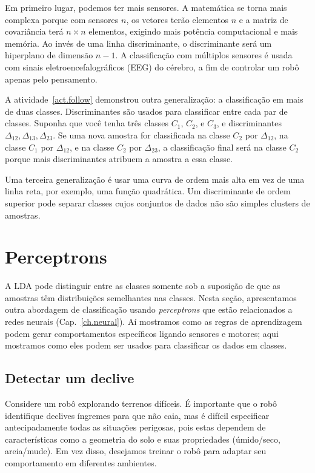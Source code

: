 Em primeiro lugar, podemos ter mais sensores. A matemática se torna mais complexa porque com sensores $n$, os vetores terão elementos $n$ e a matriz de covariância terá $n\times n$ elementos, exigindo mais potência computacional e mais memória. Ao invés de uma linha discriminante, o discriminante será um hiperplano de dimensão $n-1$. A classificação com múltiplos sensores é usada com sinais eletroencefalográficos (EEG) do cérebro, a fim de controlar um robô apenas pelo pensamento.

A atividade~\ref{act.follow} demonstrou outra generalização: a classificação em mais de duas classes. Discriminantes são usados para classificar entre cada par de classes. Suponha que você tenha três classes $C_1$, $C_2$, e $C_3$, e discriminantes $\Delta_{12}, \Delta_{13}, \Delta_{23}$. Se uma nova amostra for classificada na classe $C_2$ por $\Delta_{12}$, na classe $C_1$ por $\Delta_{12}$, e na classe $C_2$ por $\Delta_{23}$, a classificação final será na classe $C_2$ porque mais discriminantes atribuem a amostra a essa classe.

Uma terceira generalização é usar uma curva de ordem mais alta em vez de uma linha reta, por exemplo, uma função quadrática. Um discriminante de ordem superior pode separar classes cujos conjuntos de dados não são simples clusters de amostras.

\section{Perceptrons}\label{s.perceptrons}

A LDA pode distinguir entre as classes somente sob a suposição de que as amostras têm distribuições semelhantes nas classes. Nesta seção, apresentamos outra abordagem de classificação usando \emph{perceptrons} que estão relacionados a redes neurais (Cap.~\ref{ch.neural}). Aí mostramos como as regras de aprendizagem podem gerar comportamentos específicos ligando sensores e motores; aqui mostramos como eles podem ser usados para classificar os dados em classes.

\subsection{Detectar um declive}\label{s.detect-slope}

Considere um robô explorando terrenos difíceis. É importante que o robô identifique declives íngremes para que não caia, mas é difícil especificar antecipadamente todas as situações perigosas, pois estas dependem de características como a geometria do solo e suas propriedades (úmido/seco, areia/mude). Em vez disso, desejamos treinar o robô para adaptar seu comportamento em diferentes ambientes.

